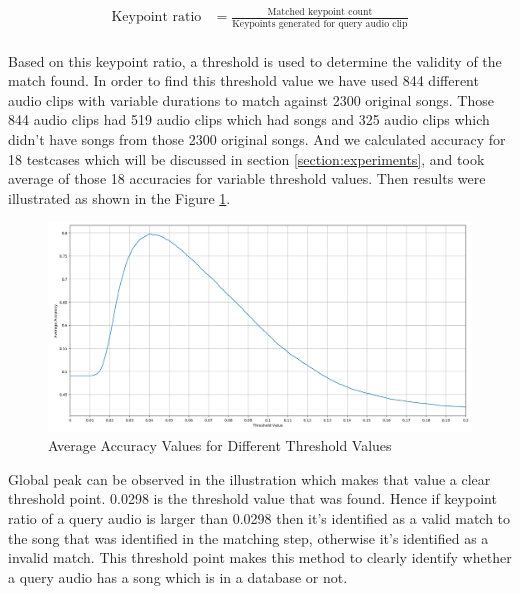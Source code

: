 \begin{align*}
\text{Keypoint ratio} &= \frac{\text{Matched keypoint count}}{\text{Keypoints generated for query audio clip}}\\
\end{align*}

Based on this keypoint ratio, a threshold is used to determine the validity of the match found. In order to find this
threshold value we have used 844 different audio clips with variable durations to match against 2300 original songs.
Those 844 audio clips had 519 audio clips which had songs and 325 audio clips which didn't have songs from those 
2300 original songs. And we calculated accuracy for 18 testcases which will be discussed in section 
\ref{section:experiments}, and took average of those 18 accuracies for variable threshold values. Then results were
illustrated as shown in the Figure \ref{fig:threshold}. 

\begin{figure}[h]
  \centering
  \includegraphics[scale=0.21]{images/threshold_adjusting.png}
  \caption{Average Accuracy Values for Different Threshold Values}
  \label{fig:threshold}
\end{figure}

Global peak can be observed in the illustration which makes that value a clear threshold point. 0.0298 is the threshold
value that was found. Hence if keypoint ratio of a query audio is larger than 0.0298 then it's identified as a valid match
to the song that was identified in the matching step, otherwise it's identified as a invalid match. This threshold point
makes this method to clearly identify whether a query audio has a song which is in a database or not.  